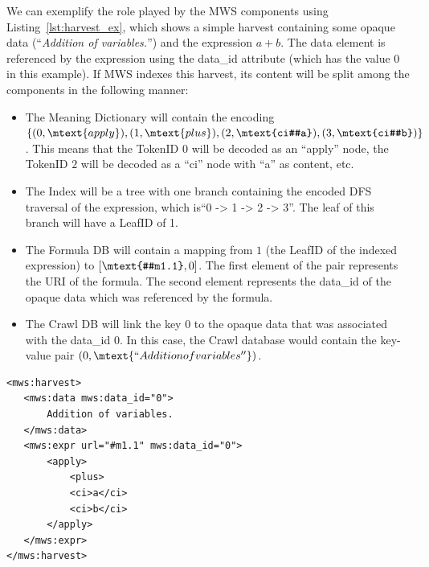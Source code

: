 \documentclass[a4paper,oneside]{article}
\def\MWS{\textsf{MWS}\xspace}
\begin{document}
We can exemplify the role played by the \MWS components using
Listing~\ref{lst:harvest_ex}, which shows a simple harvest containing some
opaque data (``\textit{Addition of variables.}'') and the expression $a+b$.
The data element is referenced by the expression using the \textsf{data_id}
attribute (which has the value $0$ in this example).
If \MWS indexes this harvest, its content will be split among the
components in the following manner:

\begin{itemize}
    \item The Meaning Dictionary will contain the encoding $\{(0,
            \mtext{apply}), (1, \mtext{plus}), (2, \mtext{ci#a}), (3,
        \mtext{ci#b})\}$. This means that the \textsf{TokenID} $0$ will be
        decoded as an ``apply'' node, the \textsf{TokenID} $2$ will be decoded
        as a ``ci'' node with ``a'' as content, etc.
    \item The Index will be a tree with one branch containing the encoded DFS
        traversal of the expression, which is``0 -> 1 -> 2 -> 3''. The leaf of
        this branch will have a \textsf{LeafID} of 1.
    \item The Formula DB will contain a mapping from $1$ (the \textsf{LeafID}
        of the indexed expression) to $[\mtext{#m1.1}, 0]$. The first element
        of the pair represents the URI of the formula. The second element
        represents the \textsf{data_id} of the opaque data which was referenced
        by the formula.
    \item The Crawl DB will link the key $0$ to the opaque data that was
        associated with the \textsf{data_id} $0$. In this case, the Crawl
        database would contain the key-value pair $(0, \mtext{``Addition of
        variables''})$.
\end{itemize}

\begin{lstlisting}[language={[m]MathML},
                   label=lst:harvest_ex,
                   frame=lines,
                   caption={Harvest Example}]
<mws:harvest>
   <mws:data mws:data_id="0">
       Addition of variables.
   </mws:data>
   <mws:expr url="#m1.1" mws:data_id="0">
       <apply>
           <plus>
           <ci>a</ci>
           <ci>b</ci>
       </apply>
   </mws:expr>
</mws:harvest>
\end{lstlisting}
\end{document}
